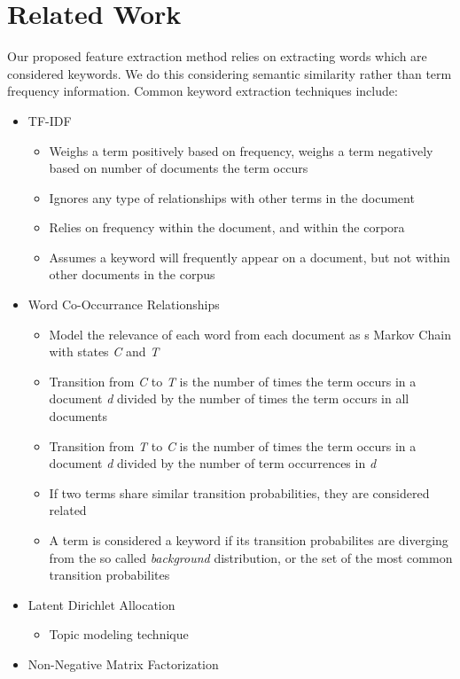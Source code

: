 \documentclass[12pt]{article}
\begin{document}
\section{Related Work}
Our proposed feature extraction method relies on extracting words which are considered keywords. We do this considering semantic similarity rather
than term frequency information.
Common keyword extraction techniques include:
\begin{itemize}
  \item TF-IDF
  \begin{itemize}
    \item Weighs a term positively based on frequency, weighs a term negatively based on number of documents the term occurs
    \item Ignores any type of relationships with other terms in the document
    \item Relies on frequency within the document, and within the corpora
    \item Assumes a keyword will frequently appear on a document, but not within other documents in the corpus
  \end{itemize}
  \item Word Co-Occurrance Relationships
  \begin{itemize}
    \item Model the relevance of each word from each document as s Markov Chain with states \textit{C} and \textit{T}
    \item Transition from \textit{C} to \textit{T} is the number of times the term occurs in a document \textit{d} divided by the number of times the term occurs in all documents
    \item Transition from \textit{T} to \textit{C} is the number of times the term occurs in a document \textit{d} divided by the number of term occurrences in \textit{d}
    \item If two terms share similar transition probabilities, they are considered related
    \item A term is considered a keyword if its transition probabilites are diverging from the so called \textit{background} distribution, or the set
    of the most common transition probabilites
  \end{itemize}
  \item Latent Dirichlet Allocation
  \begin{itemize}
    \item Topic modeling technique
  \end{itemize}
  \item Non-Negative Matrix Factorization
\end{itemize}
\end{document}
